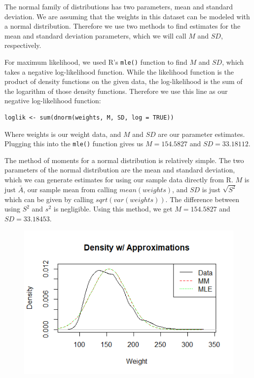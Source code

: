 \documentclass[12pt, a4paper, oneside]{report}
\begin{document}
\newpage
The normal family of distributions has two parameters, mean and standard deviation. We are assuming that the weights in this dataset can be modeled with a normal distribution. Therefore we use two methods to find estimates for the mean and standard deviation parameters, which we will call \(M\) and \(SD\), respectively.

For maximum likelihood, we used R's \lstinline{mle()} function to find \(M\) and \(SD\), which takes a negative log-likelihood function. While the likelihood function is the product of density functions on the given data, the log-likelihood is the sum of the logarithm of those density functions. Therefore we use this line as our negative log-likelihood function:

\begin{lstlisting}
loglik <- sum(dnorm(weights, M, SD, log = TRUE))
\end{lstlisting}

Where weights is our weight data, and \(M\) and \(SD\) are our parameter estimates. Plugging this into the \lstinline{mle()} function gives us \(M = 154.5827\) and \(SD = 33.18112\).

The method of moments for a normal distribution is relatively simple. The two parameters of the normal distribution are the mean and standard deviation, which we can generate estimates for using our sample data directly from R. \(M\) is just \(\bar{A}\), our sample mean from calling \(mean(weights)\), and \(SD\) is just \(\sqrt{S^2}\) which can be given by calling \(sqrt(var(weights))\). The difference between using \(S^2\) and \(s^2\) is negligible. Using this method, we get \(M = 154.5827\) and \(SD = 33.18453\).

\begin{figure}[h]
  \centering
  \includegraphics[width=0.8\linewidth]{normDensityA.png}
\end{figure}
\end{document}
